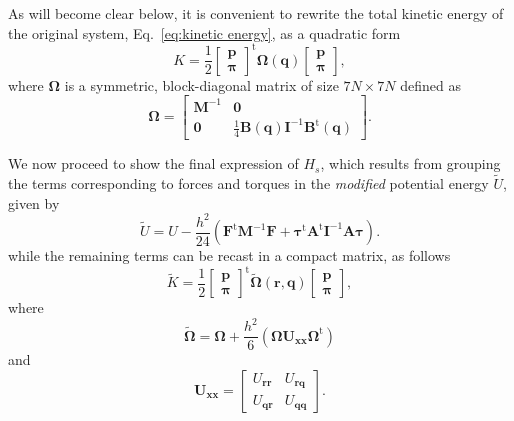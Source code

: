 \documentclass[
journal=jctcce,
layout=twocolumn
]{achemso}
\newcommand{\mt}[1]{\boldsymbol{\mathbf{#1}}}   %
\newcommand{\vt}[1]{\boldsymbol{\mathbf{#1}}}   %
\newcommand{\tr}[1]{#1^\text{t}}                %
\newcommand{\timestep}{h}
\newcommand{\refined}[1]{\widetilde{#1}}
\begin{document}
As will become clear below, it is convenient to rewrite the total kinetic energy of the original system, Eq.~\eqref{eq:kinetic energy}, as a quadratic form
\begin{equation*}
K = \frac{1}{2} \tr{ \left[\begin{array}{c} \vt p \\ \vt \pi \end{array}\right]} {\mt \Omega}(\vt q) \left[\begin{array}{c} \vt p \\ \vt \pi \end{array}\right],
\end{equation*}
where $\mt \Omega$ is a symmetric, block-diagonal matrix of size $7N \times 7N$ defined as
\begin{equation}
\label{eq:block-diagonal inverse mass tensor}
{\mt \Omega} = \left[\begin{array}{cc}
{\mt M}^{-1} & \mt 0 \\
\mt 0 & \frac{1}{4} {\mt B}(\vt q) {\mt I}^{-1} \tr{\mt B}(\vt q)
\end{array}\right].
\end{equation}

We now proceed to show the final expression of $H_s$, which results from grouping the terms corresponding to forces and torques in the \textit{modified} potential energy $\tilde{U}$, given by
\begin{equation*}
\refined U = U - \frac{\timestep^2}{24} \left( \tr{\vt F} {\mt M}^{-1} {\vt F} + \tr{\vt \tau} \tr{\mt A} {\mt I}^{-1} {\mt A} {\vt \tau} \right).
\end{equation*}
while the remaining terms can be recast in a compact matrix, as follows
\begin{equation*}
\refined K = \frac{1}{2} \tr{ \left[\begin{array}{c} \vt p \\ \vt \pi \end{array}\right]} \refined{\mathbf \Omega}(\vt r, \vt q) \left[\begin{array}{c} \vt p \\ \vt \pi \end{array}\right],
\end{equation*}
where
\begin{equation*}
\tilde{\mt \Omega} = {\mt \Omega} + \frac{\timestep^2}{6} \left( {\mt \Omega} {\mt U}_{\vt x \vt x} \tr{\mt \Omega} \right)
\end{equation*}
and
\begin{equation*}
{\mt U}_{\vt x \vt x} = \left[\begin{array}{cc}
U_{\vt r \vt r} & U_{\vt r \vt q} \\
U_{\vt q \vt r} & U_{\vt q \vt q}
\end{array}\right].
\end{equation*}
\end{document}

